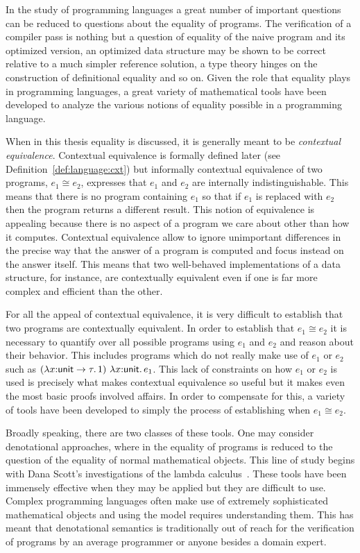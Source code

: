 In the study of programming languages a great number of important
questions can be reduced to questions about the equality of
programs. The verification of a compiler pass is nothing but a
question of equality of the naive program and its optimized version,
an optimized data structure may be shown to be correct relative to a
much simpler reference solution, a type theory hinges on the
construction of definitional equality and so on. Given the role that
equality plays in programming languages, a great variety of
mathematical tools have been developed to analyze the various notions
of equality possible in a programming language.

When in this thesis equality is discussed, it is generally meant to be
\emph{contextual equivalence}. Contextual equivalence is formally
defined later (see Definition~\ref{def:language:cxt}) but informally
contextual equivalence of two programs, $e_1 \cong e_2$, expresses
that $e_1$ and $e_2$ are internally indistinguishable. This means that
there is no program containing $e_1$ so that if $e_1$ is replaced with
$e_2$ then the program returns a different result. This notion of
equivalence is appealing because there is no aspect of a program we
care about other than how it computes. Contextual equivalence allow to
ignore unimportant differences in the precise way that the answer of a
program is computed and focus instead on the answer itself. This means
that two well-behaved implementations of a data structure, for
instance, are contextually equivalent even if one is far more complex
and efficient than the other.

For all the appeal of contextual equivalence, it is very difficult to
establish that two programs are contextually equivalent. In order to
establish that $e_1 \cong e_2$ it is necessary to quantify over all possible
programs using $e_1$ and $e_2$ and reason about their behavior. This
includes programs which do not really make use of $e_1$ or $e_2$ such
as $(\lambda x {:} \mathsf{unit} \to \tau.\, 1)\ \lambda x {:} \mathsf{unit}.\, e_1$. This
lack of constraints on how $e_1$ or $e_2$ is used is precisely what
makes contextual equivalence so useful but it makes even the most
basic proofs involved affairs. In order to compensate for this, a
variety of tools have been developed to simply the process of
establishing when $e_1 \cong e_2$.

Broadly speaking, there are two classes of these tools. One may
consider denotational approaches, where in the equality of programs is
reduced to the question of the equality of normal mathematical
objects. This line of study begins with Dana Scott's investigations of
the lambda calculus~\citep{TODO-CITE-SCOTT}. These tools have been
immensely effective when they may be applied but they are difficult to
use. Complex programming languages often make use of extremely
sophisticated mathematical objects and using the model requires
understanding them. This has meant that denotational semantics is
traditionally out of reach for the verification of programs by an
average programmer or anyone besides a domain expert.

